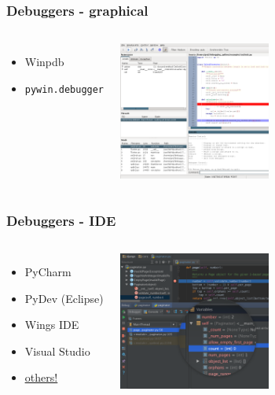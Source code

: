 \documentclass[14pt,notes,svgnames]{beamer}
\begin{document}
\begin{frame}
    \frametitle{Debuggers - graphical}
    \begin{columns}
        \begin{itemize}
            \item Winpdb
            \item \lstinline{pywin.debugger}
        \end{itemize}

        \vspace*{0cm}
        \hspace*{0cm}\includegraphics[width=5cm]{"images/winpdb.png"}

    \end{columns}
\end{frame}

\begin{frame}
    \frametitle{Debuggers - IDE}
    \begin{columns}
        \begin{itemize}
            \item PyCharm
            \item PyDev (Eclipse)
            \item Wings IDE
            \item Visual Studio
            \item \color{blue}\href{https://wiki.python.org/moin/IntegratedDevelopmentEnvironments}{\uline{others!}}
        \end{itemize}

        \vspace*{0cm}
        \hspace*{0cm}\includegraphics[width=5cm]{"images/pycharm.png"}

    \end{columns}
\end{frame}
\end{document}
